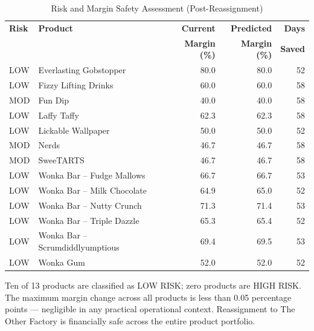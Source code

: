 \documentclass[12pt, a4paper]{article}
\begin{document}
\begin{table}[H]
\centering
\caption{Risk and Margin Safety Assessment (Post-Reassignment)}
\label{tab:risk}
\renewcommand{\arraystretch}{1.2}
\begin{tabular}{llrrr}
\toprule
\textbf{Risk} & \textbf{Product}
    & \textbf{Current} & \textbf{Predicted}
    & \textbf{Days} \\
 & & \textbf{Margin (\%)} & \textbf{Margin (\%)}
    & \textbf{Saved} \\
\midrule
\rowcolor{risklowbg} \textcolor{risklow}{LOW} & Everlasting Gobstopper           & 80.0 & 80.0 & 52 \\
\rowcolor{risklowbg} \textcolor{risklow}{LOW} & Fizzy Lifting Drinks             & 60.0 & 60.0 & 58 \\
\rowcolor{riskmodbg} \textcolor{riskmod}{MOD} & Fun Dip                          & 40.0 & 40.0 & 58 \\
\rowcolor{risklowbg} \textcolor{risklow}{LOW} & Laffy Taffy                      & 62.3 & 62.3 & 58 \\
\rowcolor{risklowbg} \textcolor{risklow}{LOW} & Lickable Wallpaper               & 50.0 & 50.0 & 52 \\
\rowcolor{riskmodbg} \textcolor{riskmod}{MOD} & Nerds                            & 46.7 & 46.7 & 58 \\
\rowcolor{riskmodbg} \textcolor{riskmod}{MOD} & SweeTARTS                        & 46.7 & 46.7 & 58 \\
\rowcolor{risklowbg} \textcolor{risklow}{LOW} & Wonka Bar -- Fudge Mallows       & 66.7 & 66.7 & 53 \\
\rowcolor{risklowbg} \textcolor{risklow}{LOW} & Wonka Bar -- Milk Chocolate      & 64.9 & 65.0 & 52 \\
\rowcolor{risklowbg} \textcolor{risklow}{LOW} & Wonka Bar -- Nutty Crunch        & 71.3 & 71.4 & 53 \\
\rowcolor{risklowbg} \textcolor{risklow}{LOW} & Wonka Bar -- Triple Dazzle       & 65.3 & 65.4 & 52 \\
\rowcolor{risklowbg} \textcolor{risklow}{LOW} & Wonka Bar -- Scrumdiddlyumptious & 69.4 & 69.5 & 53 \\
\rowcolor{risklowbg} \textcolor{risklow}{LOW} & Wonka Gum                        & 52.0 & 52.0 & 52 \\
\bottomrule
\end{tabular}
\end{table}

Ten of 13 products are classified as LOW RISK; zero products
are HIGH RISK. The maximum margin change across all products
is less than 0.05 percentage points --- negligible in any
practical operational context. Reassignment to The Other
Factory is financially safe across the entire product
portfolio.
\end{document}
